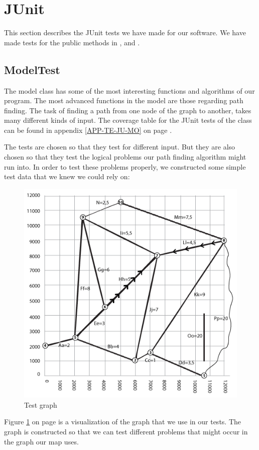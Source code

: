 \section{JUnit}
\label{TEST-JU}
This section describes the JUnit tests we have made for our software. We have
made tests for the public methods in ,  and
.

\subsection{ModelTest}
\label{TEST-JU-MT}
The model class has some of the most interesting functions and algorithms of
our program. The most advanced functions in the model are those regarding path
finding. The task of finding a path from one node of the graph to another,
takes many different kinds of input. The coverage table for the JUnit tests of
the  class can be found in appendix \ref{APP-TE-JU-MO} on page
\pageref{APP-TE-JU-MO}.

The tests are chosen so that they test for different input. But they are also
chosen so that they test the logical problems our path finding algorithm might
run into. In order to test these problems properly, we constructed some simple
test data that we knew we could rely on:

\begin{figure}[!ht]
\centering
\includegraphics[width=0.6\linewidth]{images/TestGraph}
\caption{Test graph}
\label{TEST-JU-MT-TG}
\end{figure}

Figure \ref{TEST-JU-MT-TG} on page \pageref{TEST-JU-MT-TG} is a visualization
of the graph that we use in our tests. The graph is constructed so that we can
test different problems that might occur in the graph our map uses.

